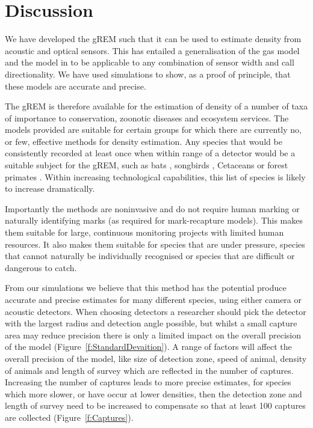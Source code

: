 \documentclass[a4paper,10pt,reqno,oneside]{amsart}
\begin{document}
                  
                  
\section{Discussion}


We have developed the gREM such that it can be used to estimate density from acoustic and optical sensors. This has entailed a generalisation of the gas model and the model in \citep{rowcliffe2008estimating} to be applicable to any combination of sensor width and call directionality. We have used simulations to show, as a proof of principle, that these models are accurate and precise.

The gREM is therefore available for the estimation of density of a number of taxa of importance to conservation, zoonotic diseases and ecosystem services. The models provided are suitable for certain groups for which there are currently no, or few, effective methods for density estimation. Any species that would be consistently recorded at least once when within range of a detector would be a suitable subject for the gREM, such as bats \citep{kunz2009methods}, songbirds \citep{buckland2006point}, Cetaceans \citep{marques2009estimating} or forest primates \citep{hassel2008reliable}. Within increasing technological capabilities, this list of species is likely to increase dramatically.

Importantly the methods are noninvasive and do not require human marking or naturally identifying marks (as required for mark-recapture models). This makes them suitable for large, continuous monitoring projects with limited human resources. It also makes them suitable for species that are under pressure, species that cannot naturally be individually recognised or species that are difficult or dangerous to catch.

From our simulations  we believe that this method has the potential produce accurate and precise estimates for many different species, using either camera or acoustic detectors. When choosing detectors a researcher should pick the detector with the largest radius and detection angle possible, but whilst a small capture area may reduce precision there is only a limited impact on the overall precision of the model (Figure~\ref{f:StandardDevaition}). A range of factors will affect the overall precision of the model, like size of detection zone, speed of animal, density of animals and length of survey which are reflected in the number of captures. Increasing the number of captures leads to more precise estimates, for species which more slower, or have occur at lower densities, then the detection zone and length of survey need to be increased to compensate so that at least 100 captures are collected (Figure~\ref{f:Captures}).
\end{document}
